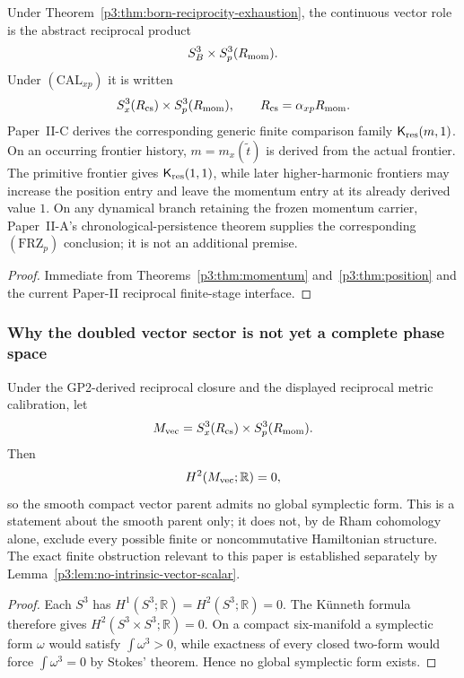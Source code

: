 \documentclass[12pt,a4paper]{article}
\begin{document}
\begin{corollary}
\label{p3:cor:doubled-vector}
Under Theorem~\ref{p3:thm:born-reciprocity-exhaustion}, the continuous vector
role is the abstract reciprocal product
\[
   S^3_B\times S^3_p(R_{\mathrm{mom}}).
\]
Under \((\mathrm{CAL}_{xp})\) it is written
\[
   S^3_x(R_{\mathrm{cs}})\times S^3_p(R_{\mathrm{mom}}),\qquad
   R_{\mathrm{cs}}=\alpha_{xp}R_{\mathrm{mom}}.
\]
Paper~II-C derives the corresponding generic finite comparison family
$\mathsf K_{\rm res}(m,1)$.  On an occurring frontier history,
$m=m_x(\widetilde t)$ is derived from the actual frontier.  The primitive
frontier gives $\mathsf K_{\rm res}(1,1)$, while later higher-harmonic
frontiers may increase the position entry and leave the momentum entry at its
already derived value $1$.  On any dynamical branch retaining the frozen
momentum carrier, Paper~II-A's chronological-persistence theorem supplies
the corresponding $(\mathrm{FRZ}_p)$ conclusion; it is not an additional
premise.
\end{corollary}

\begin{proof}
Immediate from Theorems~\ref{p3:thm:momentum} and~\ref{p3:thm:position} and
the current Paper-II reciprocal finite-stage interface.
\end{proof}

\subsubsection{Why the doubled vector sector is not yet a complete phase space}
\label{p3:subsec:scalar-closure}

\begin{theorem}
\label{p3:thm:vector-sector-not-symplectic}
Under the GP2-derived reciprocal closure and the displayed reciprocal metric calibration, let
\[
   M_{\rm vec}=S^3_x(R_{\mathrm{cs}})\times S^3_p(R_{\mathrm{mom}}).
\]
Then
\[
   H^2(M_{\rm vec};\mathbb R)=0,
\]
so the smooth compact vector parent admits no global symplectic form.  This is a
statement about the smooth parent only; it does not, by de Rham cohomology
alone, exclude every possible finite or noncommutative Hamiltonian structure.
The exact finite obstruction relevant to this paper is established separately
by Lemma~\ref{p3:lem:no-intrinsic-vector-scalar}.
\end{theorem}

\begin{proof}
Each $S^3$ has $H^1(S^3;\mathbb R)=H^2(S^3;\mathbb R)=0$.  The K\"unneth
formula therefore gives $H^2(S^3\times S^3;\mathbb R)=0$.  On a compact
six-manifold a symplectic form $\omega$ would satisfy
$\int \omega^3>0$, while exactness of every closed two-form would force
$\int \omega^3=0$ by Stokes' theorem.  Hence no global symplectic form
exists.
\end{proof}
\end{document}
